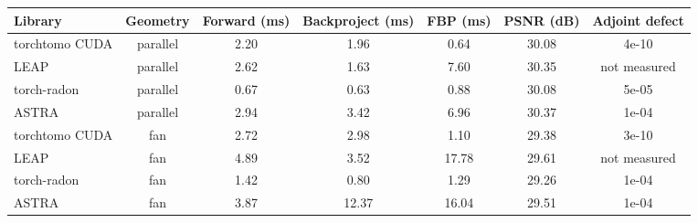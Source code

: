 \begin{tabular}{lcccccc}
\toprule
Library & Geometry & Forward (ms) & Backproject (ms) & FBP (ms) & PSNR (dB) & Adjoint defect \\
\midrule
torchtomo CUDA & parallel & 2.20 & 1.96 & 0.64 & 30.08 & 4e-10 \\
LEAP & parallel & 2.62 & 1.63 & 7.60 & 30.35 & not measured \\
torch-radon & parallel & 0.67 & 0.63 & 0.88 & 30.08 & 5e-05 \\
ASTRA & parallel & 2.94 & 3.42 & 6.96 & 30.37 & 1e-04 \\
torchtomo CUDA & fan & 2.72 & 2.98 & 1.10 & 29.38 & 3e-10 \\
LEAP & fan & 4.89 & 3.52 & 17.78 & 29.61 & not measured \\
torch-radon & fan & 1.42 & 0.80 & 1.29 & 29.26 & 1e-04 \\
ASTRA & fan & 3.87 & 12.37 & 16.04 & 29.51 & 1e-04 \\
\bottomrule
\end{tabular}